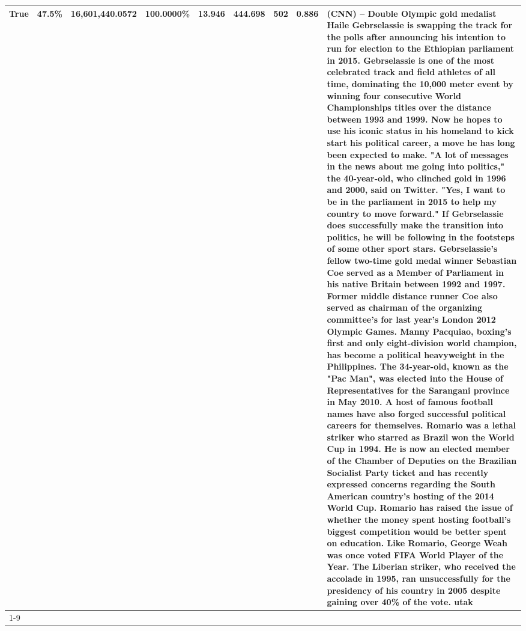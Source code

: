 \begin{table}[H]
{\begin{tabular}{lllrlllll}
True & 47.5\% & 16,601,440.0572 & \bfseries \color{red} 100.0000\% & 13.946 & 444.698 & 502 & 0.886 & (CNN) -- Double Olympic gold medalist Haile Gebrselassie is swapping the track for the polls after announcing his intention to run for election to the Ethiopian parliament in 2015. Gebrselassie is one of the most celebrated track and field athletes of all time, dominating the 10,000 meter event by winning four consecutive World Championships titles over the distance between 1993 and 1999. Now he hopes to use his iconic status in his homeland to kick start his political career, a move he has long been expected to make. "A lot of messages in the news about me going into politics," the 40-year-old, who clinched gold in 1996 and 2000, said on Twitter. "Yes, I want to be in the parliament in 2015 to help my country to move forward." If Gebrselassie does successfully make the transition into politics, he will be following in the footsteps of some other sport stars. Gebrselassie's fellow two-time gold medal winner Sebastian Coe served as a Member of Parliament in his native Britain between 1992 and 1997. Former middle distance runner Coe also served as chairman of the organizing committee's for last year's London 2012 Olympic Games. Manny Pacquiao, boxing's first and only eight-division world champion, has become a political heavyweight in the Philippines. The 34-year-old, known as the "Pac Man", was elected into the House of Representatives for the Sarangani province in May 2010. A host of famous football names have also forged successful political careers for themselves. Romario was a lethal striker who starred as Brazil won the World Cup in 1994. He is now an elected member of the Chamber of Deputies on the Brazilian Socialist Party ticket and has recently expressed concerns regarding the South American country's hosting of the 2014 World Cup. Romario has raised the issue of whether the money spent hosting football's biggest competition would be better spent on education. Like Romario, George Weah was once voted FIFA World Player of the Year. The Liberian striker, who received the accolade in 1995, ran unsuccessfully for the presidency of his country in 2005 despite gaining over 40\% of the vote. utak \\
\cline{1-9}

\end{tabular}}
\end{table}
